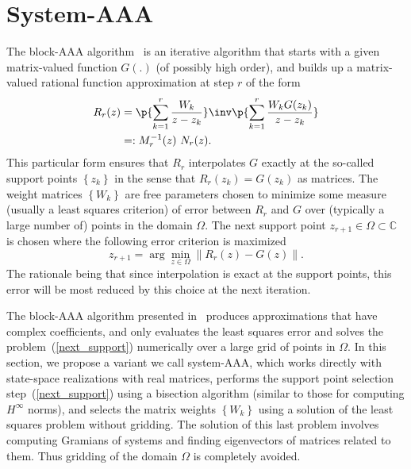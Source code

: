 \documentclass[letterpaper, 10 pt, conference]{ieeeconf}  %
\begin{document}
\section{System-AAA}
The block-AAA algorithm~\cite{gosea2021algorithms} is an iterative algorithm that starts with a given matrix-valued function $G(.)$ (of possibly high order), 
and builds up a matrix-valued rational function approximation at step $r$  of the form
\begin{align}
        R_r(z) &= \p{\sum_{k=1}^r \frac{W_k}{z-z_k}}\inv \p{\sum_{k=1}^r \frac{W_kG(z_k)}{z-z_k}} 	  \label{blockAAA}	\\
        &=: M^{-1}_r(z) ~N_r(z) . 															\nonumber
\end{align}
This particular form ensures that $R_r$ interpolates $G$ exactly at the so-called support points $\left\{ z_k \right\}$ in the sense
that $R_r(z_k) = G(z_k)$ as matrices. The weight  matrices $\left\{ W_k \right\}$ are free parameters 
 chosen to minimize some measure (usually a least squares criterion) of 
error between $R_r$ and $G$ over (typically a large number of) points in the domain $\Omega$. 
The  next support point $z_{r+1} \in \Omega \subset \mathbb{C}$ is 
chosen where  the following error criterion is maximized 
\begin{equation}
	z_{r+1} = \arg\min_{z\in\Omega} \left\| R_r(z) - G(z) \right\| .
  \label{next_support}
\end{equation} 
The rationale being that since interpolation is exact at the support points, this error will be most reduced by this choice at 
the next iteration. 

The block-AAA algorithm presented in~\cite{gosea2021algorithms} produces approximations that have complex coefficients, and only evaluates the least squares error and solves the problem~(\ref{next_support}) numerically  over a large grid of points in $\Omega$. In this section, we propose a variant we call system-AAA, which works directly with state-space realizations with real matrices, performs the support point selection step~(\ref{next_support}) using a bisection algorithm (similar to those for computing $H^\infty$ norms), and selects the matrix weights $\left\{ W_k \right\}$ using a solution of the least squares problem without gridding. The solution of this last problem involves computing Gramians of systems and finding eigenvectors of matrices related to them. Thus gridding of the domain $\Omega$ is completely avoided. 

\end{document}
